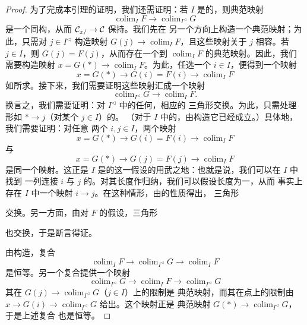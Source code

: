 \begin{proof}
为了完成本引理的证明，我们还需证明：若 $I$ 是\trConnected{}的，则典范映射
\[
\operatorname{colim}_{I} F \to
\operatorname{colim}_{I^{\triangleleft}} G
\]
是一个同构，从而\trFunctor{} $\mathcal{C}_{x/} \to \mathcal{C}$ 保持\trConnected{}\trColimit{}。我们先在
另一个方向上构造一个典范映射；为此，只需对 $j \in I^{\triangleleft}$ 构造映射
$G(j) \to \operatorname{colim}_I F$，且这些映射关于 $j$ 相容。若 $j \in I$，则
$G(j) = F(j)$，从而存在一个到 $\operatorname{colim}_I F$ 的典范映射。因此，我们
需要构造映射 $x = G(\ast) \to \operatorname{colim}_I F$。为此，任选一个%
\trObject{} $i \in I$，便得到一个映射
\[
x = G(\ast) \to G(i) = F(i) \to \operatorname{colim}_I F
\]
如所求。接下来，我们需要证明这些映射汇成一个映射
\[
\operatorname{colim}_{I^{\triangleleft}} G \to \operatorname{colim}_I F.
\]
换言之，我们需要证明：对 $I^{\triangleleft}$ 中的任何\trMorphism{}，相应的
三角形交换。为此，只需处理形如 $\ast \to j$（对某个 $j \in I$）的\trMorphism{}。
（对于 $I$ 中的\trMorphism{}，由构造它已经成立。）具体地，我们需要证明：对任意
两个\trObject{} $i, j \in I$，两个映射
\[
x = G(\ast) \to G(i) = F(i) \to \operatorname{colim}_I F
\]
与
\[
x = G(\ast) \to G(j) = F(j) \to \operatorname{colim}_I F
\]
是同一个映射。这正是 $I$ 是\trConnected{}的这一假设的用武之地：也就是说，我们可以在 $I$ 中找到
一列连接 $i$ 与 $j$ 的\trMorphism{}。对其长度作归纳，我们可以假设长度为一，从而
事实上存在 $I$ 中一个映射 $i \to j$。在这种情形，由\trColimit{}的性质得出，
三角形
\begin{center}
\end{center}
交换。另一方面，由对 $F$ 的假设，三角形
\begin{center}
\end{center}
也交换，于是断言得证。

由构造，复合
\[
\operatorname{colim}_{I} F \to
\operatorname{colim}_{I^{\triangleleft}} G \to
\operatorname{colim}_{I} F
\]
是恒等。另一个复合提供一个映射
\[
\operatorname{colim}_{I^{\triangleleft}} G \to
\operatorname{colim}_{I} F \to
\operatorname{colim}_{I^{\triangleleft}} G
\]
其在 $G(j) \to \operatorname{colim}_{I^{\triangleleft}} G$（$j \in I$）上的限制是
典范映射，而其在\trCone{}点上的限制由
$x \to G(i) \to \operatorname{colim}_{I^{\triangleleft}} G$ 给出。这个映射正是
典范映射 $G(\ast) \to \operatorname{colim}_{I^{\triangleleft}} G$，于是上述复合
也是恒等。
\end{proof}


